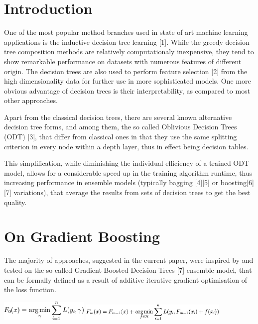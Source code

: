 \documentclass[twoside]{article}
\begin{document}
\begin{multicols}{2} %

\section{Introduction}

	One of the most popular method branches used in state of art machine learning applications is the inductive decision tree learning [1]. While the greedy decision tree composition methods are relatively computationaly inexpensive, they tend to show remarkable performance on datasets with numerous features of different origin. The decision trees are also used to perform feature selection [2] from the high dimensionality data for further use in more sophisticated models. One more obvious advantage of decision trees is their interpretability, as compared to most other approaches.
    

	Apart from the classical decision trees, there are several known alternative decision tree forms, and among them, the so called Oblivious Decision Trees (ODT) [3], that differ from classical ones in that they use the same splitting criterion in every node within a depth layer, thus in effect being decision tables.
    

	This simplification, while diminishing the individual efficiency of a trained ODT model, allows for a considerable speed up in the training algorithm runtime, thus increasing performance in ensemble models (typically bagging [4][5] or boosting[6][7] variations), that average the results from sets of decision trees to get the best quality.



\section{On Gradient Boosting}

The majority of approaches, suggested in the current paper, were inspired by and tested on the so called Gradient Boosted Decision Trees [7] ensemble model, that can be formally defined as a result of additive iterative gradient optimisation of the loss function.


\includegraphics[width=120pt]{f1.png} 
\newline
\includegraphics[width=200pt]{f2.png}



\end{multicols}
\end{document}
